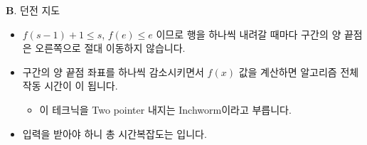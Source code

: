 \begin{frame}{\textbf{B}. 던전 지도}
    \begin{itemize}
        \item $f(s-1)+1 \le s$, $f(e) \le e$ 이므로 행을 하나씩 내려갈 때마다 구간의 양 끝점은 오른쪽으로 절대 이동하지 않습니다.
        \item 구간의 양 끝점 좌표를 하나씩 감소시키면서 $f(x)$ 값을 계산하면 알고리즘 전체 작동 시간이 이 됩니다.
        \begin{itemize}
            \item 이 테크닉을 Two pointer 내지는 Inchworm이라고 부릅니다.
        \end{itemize}
        \item 입력을 받아야 하니 총 시간복잡도는  입니다.
    \end{itemize}
\end{frame}